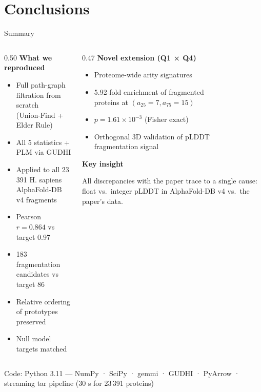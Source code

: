 \documentclass[aspectratio=169, 10pt]{beamer}
\begin{document}
\section{Conclusions}

\begin{frame}{Summary}
  \begin{columns}[T]
    \begin{column}{0.50\textwidth}
      \textbf{What we reproduced}
      \begin{itemize}
        \item Full path-graph filtration from scratch\\
              (Union-Find + Elder Rule)
        \item All 5 statistics + PLM via GUDHI
        \item Applied to all 23\,391 H. sapiens\\
              AlphaFold-DB v4 fragments
        \item Pearson $r = 0.864$ vs target 0.97
        \item 183 fragmentation candidates vs target 86
        \item Relative ordering of prototypes preserved \checkmark
        \item Null model targets matched \checkmark
      \end{itemize}
    \end{column}
    \begin{column}{0.47\textwidth}
      \textbf{Novel extension (Q1 × Q4)}
      \begin{itemize}
        \item Proteome-wide arity signatures
        \item 5.92-fold enrichment of fragmented\\
              proteins at $(a_{25}=7, a_{75}=15)$
        \item $p = 1.61\times10^{-3}$ (Fisher exact)
        \item Orthogonal 3D validation of pLDDT\\
              fragmentation signal
      \end{itemize}
      \vspace{10pt}

      \textbf{Key insight}
      \begin{block}{}
        All discrepancies with the paper trace to
        a single cause: float vs.\ integer pLDDT
        in AlphaFold-DB v4 vs.\ the paper's data.
      \end{block}
    \end{column}
  \end{columns}
  \vspace{6pt}
  \begin{center}
    \footnotesize
    Code: Python 3.11 — NumPy · SciPy · gemmi · GUDHI · PyArrow
    · streaming tar pipeline (30 s for 23\,391 proteins)
  \end{center}
\end{frame}
\end{document}
